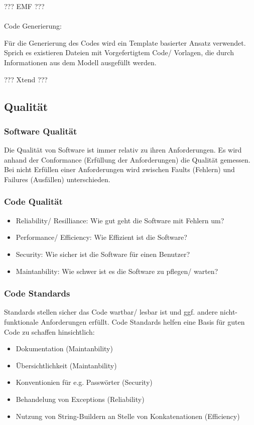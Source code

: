 ??? EMF ???
\\ \\
Code Generierung:

Für die Generierung des Codes wird ein Template basierter Ansatz verwendet.
Sprich es existieren Dateien mit Vorgefertigtem Code/ Vorlagen, die durch Informationen aus dem Modell ausgefüllt werden.

??? Xtend ???

\subsection{Qualität}

\subsubsection{Software Qualität}

Die Qualität von Software ist immer relativ zu ihren Anforderungen.
Es wird anhand der Conformance (Erfüllung der Anforderungen) die Qualität gemessen.
Bei nicht Erfüllen einer Anforderungen wird zwischen Faults (Fehlern) und Failures (Ausfällen) unterschieden.

\subsubsection{Code Qualität}

\begin{itemize}
    \item Reliability/ Resilliance: Wie gut geht die Software mit Fehlern um?
    \item Performance/ Efficiency: Wie Effizient ist die Software?
    \item Security: Wie sicher ist die Software für einen Benutzer?
    \item Maintanbility: Wie schwer ist es die Software zu pflegen/ warten?
\end{itemize}

\subsubsection{Code Standards}

Standards stellen sicher das Code wartbar/ lesbar ist und ggf. andere nicht-funktionale Anforderungen erfüllt.
Code Standards helfen eine Basis für guten Code zu schaffen hinsichtlich:
\begin{itemize}
    \item Dokumentation (Maintanbility)
    \item Übersichtlichkeit (Maintanbility)
    \item Konventionien für e.g. Passwörter (Security)
    \item Behandelung von Exceptions (Reliability)
    \item Nutzung von String-Buildern an Stelle von Konkatenationen (Efficiency)
\end{itemize}

